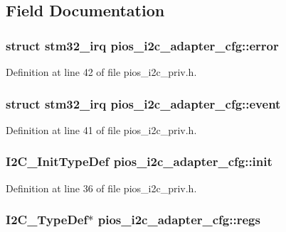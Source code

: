 \subsection{\-Field \-Documentation}
\hypertarget{structpios__i2c__adapter__cfg_a5e418625b07806a90c8f5a55cc1165eb}{
\subsubsection[{error}]{\setlength{\rightskip}{0pt plus 5cm}struct {\bf stm32\-\_\-irq} {\bf pios\-\_\-i2c\-\_\-adapter\-\_\-cfg\-::error}}}\label{structpios__i2c__adapter__cfg_a5e418625b07806a90c8f5a55cc1165eb}


\-Definition at line 42 of file pios\-\_\-i2c\-\_\-priv.\-h.

\hypertarget{structpios__i2c__adapter__cfg_acdad71da492ab5d4582a5b03cd7d1ab2}{
\subsubsection[{event}]{\setlength{\rightskip}{0pt plus 5cm}struct {\bf stm32\-\_\-irq} {\bf pios\-\_\-i2c\-\_\-adapter\-\_\-cfg\-::event}}}\label{structpios__i2c__adapter__cfg_acdad71da492ab5d4582a5b03cd7d1ab2}


\-Definition at line 41 of file pios\-\_\-i2c\-\_\-priv.\-h.

\hypertarget{structpios__i2c__adapter__cfg_a7c0f3d2e295cc0583245ad41d61e33fe}{
\subsubsection[{init}]{\setlength{\rightskip}{0pt plus 5cm}\-I2\-C\-\_\-\-Init\-Type\-Def {\bf pios\-\_\-i2c\-\_\-adapter\-\_\-cfg\-::init}}}\label{structpios__i2c__adapter__cfg_a7c0f3d2e295cc0583245ad41d61e33fe}


\-Definition at line 36 of file pios\-\_\-i2c\-\_\-priv.\-h.

\hypertarget{structpios__i2c__adapter__cfg_af657d3f333ba35a0c78315381851f748}{
\subsubsection[{regs}]{\setlength{\rightskip}{0pt plus 5cm}\-I2\-C\-\_\-\-Type\-Def$\ast$ {\bf pios\-\_\-i2c\-\_\-adapter\-\_\-cfg\-::regs}}}\label{structpios__i2c__adapter__cfg_af657d3f333ba35a0c78315381851f748}


